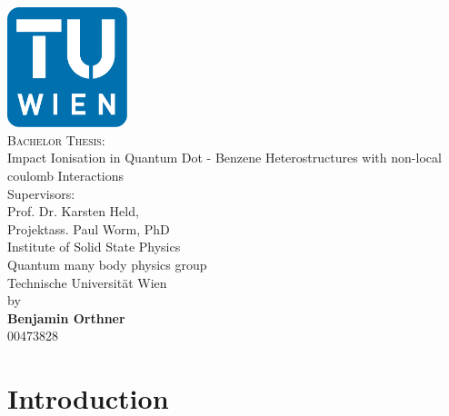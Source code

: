\documentclass[oneside]{scrbook}			%
\begin{document}
\begin{titlepage}
\begin{center}
  \includegraphics[width=35mm]{./graph/TU_Signet.pdf} \\[10mm]
  {\LARGE \textsc{Bachelor Thesis:}}\\[10mm]
  {\LARGE Impact Ionisation in Quantum Dot - Benzene Heterostructures with non-local coulomb Interactions }\\[10mm]
  	Supervisors:\\
  Prof. Dr. Karsten Held,\\
  Projektass. Paul Worm, PhD\\
  \vspace{5mm}
  Institute of Solid State Physics\\
  Quantum many body physics group\\
  Technische Universit\"at Wien\\[5mm]
  
  by\\[5mm]
  \textbf{Benjamin Orthner}\\
  00473828
\end{center}
  \date{\today}
\vspace{\fill}
\begin{flushright} %
\makeatletter
\@date
\makeatother
\end{flushright}
\end{titlepage}


\thispagestyle{empty} \clearpage										%
\pagestyle{plain}  %



\tableofcontents
\chapter{Introduction}




%
\end{document}
